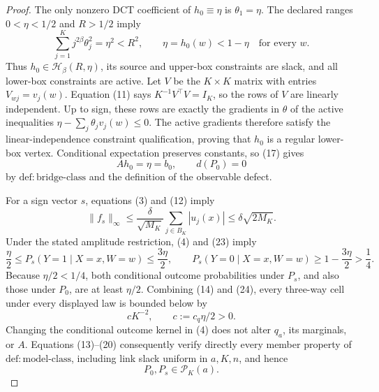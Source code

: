 \documentclass{article}
\begin{document}
\begin{proof}
The only nonzero DCT coefficient of \(h_0\equiv\eta\) is \(\theta_1=\eta\).  The declared ranges \(0<\eta<1/2\) and \(R>1/2\) imply
\[
\sum_{j=1}^Kj^{2\beta}\theta_j^2=\eta^2<R^2,
\qquad
\eta=h_0(w)<1-\eta
\quad\text{for every }w.
\tag{21}
\]
Thus \(h_0\in\mathcal H_\beta(R,\eta)\), its source and upper-box constraints are slack, and all lower-box constraints are active.  Let \(V\) be the \(K\times K\) matrix with entries \(V_{wj}=v_j(w)\).  Equation (11) says \(K^{-1}V^\top V=I_K\), so the rows of \(V\) are linearly independent.  Up to sign, these rows are exactly the gradients in \(\theta\) of the active inequalities \(\eta-\sum_j\theta_jv_j(w)\le0\).  The active gradients therefore satisfy the linear-independence constraint qualification, proving that \(h_0\) is a regular lower-box vertex.  Conditional expectation preserves constants, so (17) gives
\[
Ah_0=\eta=b_0,
\qquad
d(P_0)=0
\tag{22}
\]
by \(\mathrm{def:bridge\mbox{-}class}\) and the definition of the observable defect.

For a sign vector \(s\), equations (3) and (12) imply
\[
\|f_s\|_\infty
\le \frac{\delta}{\sqrt{M_K}}\sum_{j\in B_K}|u_j(x)|
\le\delta\sqrt{2M_K}.
\tag{23}
\]
Under the stated amplitude restriction, (4) and (23) imply
\[
\frac\eta2\le P_s(Y=1\mid X=x,W=w)\le\frac{3\eta}{2},
\qquad
P_s(Y=0\mid X=x,W=w)\ge1-\frac{3\eta}{2}>\frac14.
\tag{24}
\]
Because \(\eta/2<1/4\), both conditional outcome probabilities under \(P_s\), and also those under \(P_0\), are at least \(\eta/2\).  Combining (14) and (24), every three-way cell under every displayed law is bounded below by
\[
cK^{-2},
\qquad
c:=c_q\eta/2>0.
\tag{25}
\]
Changing the conditional outcome kernel in (4) does not alter \(q_a\), its marginals, or \(A\).  Equations (13)--(20) consequently verify directly every member property of \(\mathrm{def:model\mbox{-}class}\), including link slack uniform in \(a,K,n\), and hence
\[
P_0,P_s\in\mathcal P_K(a).
\tag{26}
\]


\end{proof}
\end{document}
